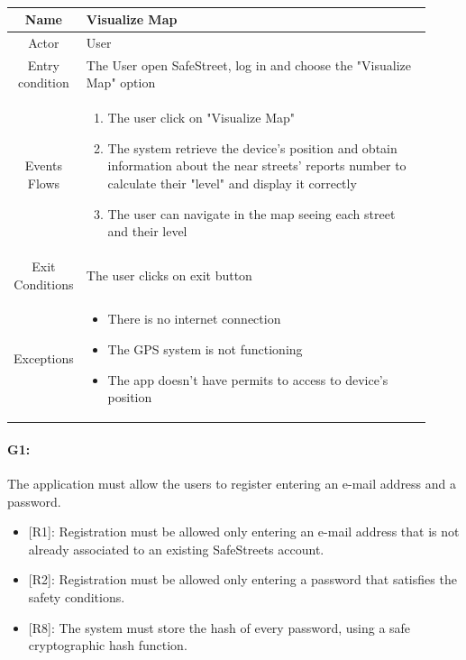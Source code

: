 \documentclass[12pt,a4paper]{report}
\begin{document}
				\begin{table}[H]
					\centering
					\begin{tabular}{|c|p{0.92\linewidth}|}
						\hline
						Name & {Visualize Map} \\
						\hline
						Actor & {User} \\
						\hline
						Entry condition & {The User open SafeStreet, log in and choose the "Visualize Map" option} \\
						\hline
						Events Flows &{ 
								\vskip 4pt
								\begin{enumerate}
									\item The user click on "Visualize Map"
									\item The system retrieve the device's position and obtain information about
										the near streets' reports number to calculate their "level" and display
										it correctly
									\item The user can navigate in the map seeing each street and their level
								\end{enumerate}
								\vskip 4pt}\\
						\hline
						Exit Conditions & {The user clicks on exit button} \\
						\hline
						Exceptions & {
								\vskip 4pt
								\begin{itemize}
									\item There is no internet connection
									\item The GPS system is not functioning
									\item The app doesn't have permits to access to device's position
								\end{itemize}
								\vskip 4pt
						} \\
						\hline
					\end{tabular}
					\caption{}
					\label{tab: }
				\end{table}


			
			
			
			\paragraph {G1:} The application must allow the users to register entering an e-mail address and a password.
			\begin{itemize}
				\item{[R1]:} Registration must be allowed only entering an e-mail address that is not already associated to an existing SafeStreets account.
				\item{[R2]:} Registration must be allowed only entering a password that satisfies the safety conditions.
				\item{[R8]:} The system must store the hash of every password, using a safe cryptographic hash function.
			\end{itemize}
\end{document}
